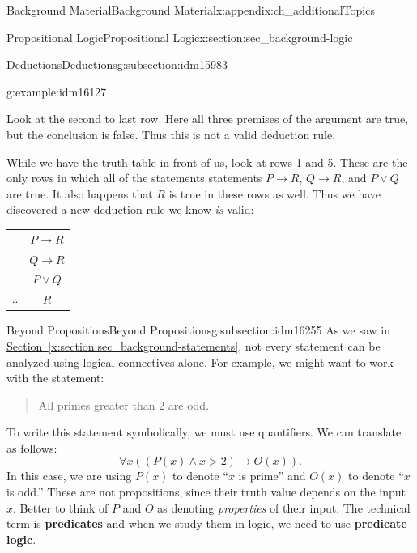\documentclass[oneside,10pt,]{book}
\newcommand{\terminology}[1]{\textbf{#1}}
\numberwithin{equation}{chapter}
\newcommand{\hrulethin}  {\noalign{\hrule height 0.04em}}
\def\imp{\rightarrow}
\newcommand{\gt}{>}
\begin{document}
\begin{appendixptx}{Background Material}{}{Background Material}{}{}{x:appendix:ch_additionalTopics}
\begin{sectionptx}{Propositional Logic}{}{Propositional Logic}{}{}{x:section:sec_background-logic}
\begin{subsectionptx}{Deductions}{}{Deductions}{}{}{g:subsection:idm15983}
\begin{example}{}{g:example:idm16127}
\begin{sidebyside}{1}{0}{0}{0}
\begin{sbspanel}{1}
\end{sbspanel}%
\end{sidebyside}%
\par
Look at the second to last row.  Here all three premises of the argument are true, but the conclusion is false.  Thus this is not a valid deduction rule.%
\par
While we have the truth table in front of us, look at rows 1 and 5.  These are the only rows in which all of the statements statements \(P \imp R\), \(Q \imp R\), and \(P\vee Q\) are true.  It also happens that \(R\) is true in these rows as well.  Thus we have discovered a new deduction rule we know \emph{is} valid:%
\begin{sidebyside}{1}{0}{0}{0}%
\begin{sbspanel}{1}%
{\centering%
\begin{tabular}{cc}
&\(P \imp R\)\tabularnewline[0pt]
&\(Q \imp R\)\tabularnewline[0pt]
&\(P \vee Q\)\tabularnewline\hrulethin
\(\therefore\)&\(R\)
\end{tabular}
\par}
\end{sbspanel}%
\end{sidebyside}%
\end{example}
\end{subsectionptx}
%
%
\typeout{************************************************}
\typeout{************************************************}
%
\begin{subsectionptx}{Beyond Propositions}{}{Beyond Propositions}{}{}{g:subsection:idm16255}
As we saw in \hyperref[x:section:sec_background-statements]{Section~\ref{x:section:sec_background-statements}}, not every statement can be analyzed using logical connectives alone.  For example, we might want to work with the statement:%
\begin{quote}%
All primes greater than 2 are odd.%
\end{quote}
To write this statement symbolically, we must use quantifiers.  We can translate as follows:%
\begin{equation*}
\forall x ((P(x) \wedge x \gt 2) \imp O(x)).
\end{equation*}
In this case, we are using \(P(x)\) to denote ``\(x\) is prime'' and \(O(x)\) to denote ``\(x\) is odd.''  These are not propositions, since their truth value depends on the input \(x\).  Better to think of \(P\) and \(O\) as denoting \emph{properties} of their input.  The technical term is \terminology{predicates} and when we study them in logic, we need to use \terminology{predicate logic}.%

\end{subsectionptx}
\end{sectionptx}
\end{appendixptx}
\end{document}
